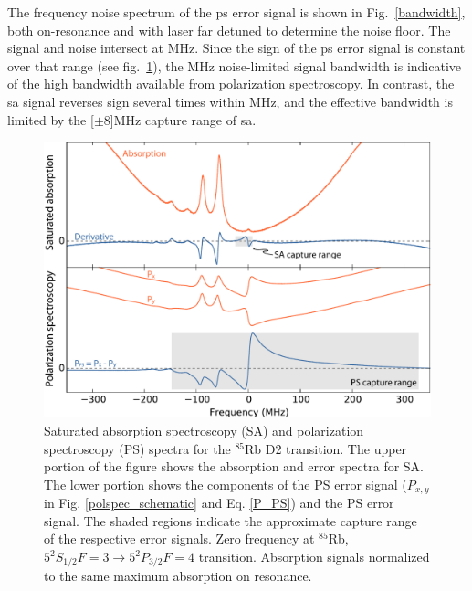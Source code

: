 The frequency noise spectrum of the \gls*{ps} error signal is shown in  Fig.~\ref{bandwidth}, both on-resonance and with laser far detuned to determine the noise floor.  The signal and noise intersect at \unit[83]{MHz}.
Since the sign of the \gls*{ps} error signal is constant over that range (see fig.~\ref{sa_ps_spectra}), the \unit[83]{MHz} noise-limited signal bandwidth is indicative of the high bandwidth available from polarization spectroscopy.
In contrast, the \gls*{sa} signal reverses sign several times within \unit[83]{MHz}, and the effective bandwidth is limited by the \unit[$\pm 8$]{MHz} capture range of \gls*{sa}.

\begin{figure}[htbp]
    \centering
    \includegraphics[width=\linewidth]{part1/Figs/fig2_v1.pdf}
    \caption{Saturated absorption spectroscopy (SA) and polarization spectroscopy (PS) spectra for the $^{85}$Rb D2 transition.
The upper portion of the figure shows the absorption and error spectra for SA.
The lower portion shows the components of the PS error signal ($P_{x,y}$ in Fig. \ref{polspec_schematic} and Eq. \ref{P_PS}) and the PS error signal.
The shaded regions indicate the approximate capture range of the respective error signals.
Zero frequency at $^{85}$Rb, $5^2S_{1/2} F=3\rightarrow5^2P_{3/2} F=4$ transition.
Absorption signals normalized to the same maximum absorption on resonance.}
    \label{sa_ps_spectra}
\end{figure}

